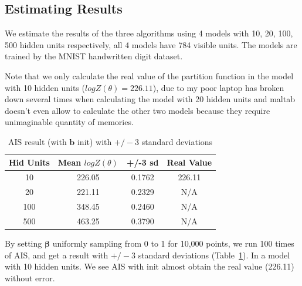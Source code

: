 
\subsection{Estimating Results}

We estimate the results of the three algorithms using 4 models with 10, 20, 100, 500 hidden units respectively, all 4 models have 784 visible units. The models are trained by the MNIST handwritten digit dataset\cite{lecun1998mnist}.

Note that we only calculate the real value of the partition function in the model with 10 hidden units ($logZ(\theta)=226.11$), due to my poor laptop has broken down several times when calculating the model with 20 hidden units and maltab doesn't even allow to calculate the other two models because they require unimaginable quantity of memories.

\begin{table}[t]
\centering
{\small
\begin{tabular}{c|ccc}
    \hline
    \textbf{Hid Units} & \textbf{Mean $logZ(\theta)$} & \textbf{+/-3 sd} & \textbf{Real Value} \\ 
    \hline
	   10  & 226.05 & 0.1762 & 226.11 \\
	   20  & 221.11 & 0.2329 & N/A 	  \\
	   100 & 348.45 & 0.2460 & N/A 	  \\
	   500 & 463.25 & 0.3790 & N/A 	  \\ \hline
\end{tabular}
}
\vspace{-0.1in}
\caption{AIS result (with $\mathbf b$ init) with $+/-3$ standard deviations}
\label{tab:aisresult}
\end{table}
By setting $\mathbf \beta$ uniformly sampling from 0 to 1 for 10,000 points, we run 100 times of AIS, and get a result with $+/-3$ standard deviations (Table~\ref{tab:aisresult}). In a model with 10 hidden units. We see AIS with init almost obtain the real value (226.11) without error.

